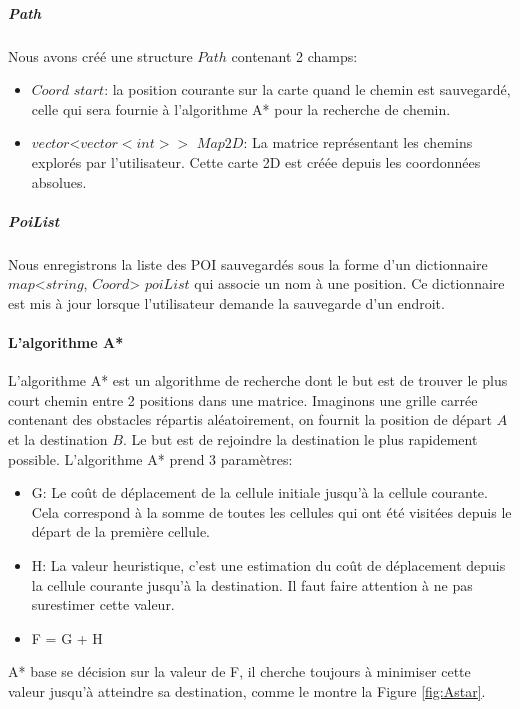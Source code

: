 \documentclass[11pt]{article}
\begin{document}
          \subparagraph{Path}        
            Nous avons créé une structure $Path$ contenant 2 champs: 
            \begin{itemize}
              \item $Coord$ $start$: la position courante sur la carte quand le chemin est sauvegardé, celle qui sera fournie à l'algorithme
              A* pour la recherche de chemin.
              \item $vector$<$vector<int>>$ $Map2D$: La matrice représentant les chemins explorés par l'utilisateur. Cette carte 2D est créée 
              depuis les coordonnées absolues.     
            \end{itemize} 

          \subparagraph{PoiList}   
            Nous enregistrons la liste des POI sauvegardés sous la forme d'un dictionnaire $map$<$string$, $Coord$> $poiList$ qui associe
            un nom à une position. Ce dictionnaire est mis à jour lorsque l'utilisateur demande la sauvegarde d'un endroit.            

        \paragraph{L'algorithme A*}
          L'algorithme A* est un algorithme de recherche dont le but est de trouver le plus court chemin entre 2 positions dans une matrice.
          Imaginons une grille carrée contenant des obstacles répartis aléatoirement, on fournit la position de départ $A$ et la destination $B$.
          Le but est de rejoindre la destination le plus rapidement possible.
          L'algorithme A* prend 3 paramètres:

          \begin{itemize}
            \item G: Le coût de déplacement de la cellule initiale jusqu'à la cellule courante. Cela correspond à la somme de toutes les 
            cellules qui ont été visitées depuis le départ de la première cellule.
            \item H: La valeur heuristique, c'est une estimation du coût de déplacement depuis la cellule courante jusqu'à la destination. 
            Il faut faire attention à ne pas surestimer cette valeur.
            \item F = G + H            
          \end{itemize} 
          A* base se décision sur la valeur de F, il cherche toujours à minimiser cette valeur jusqu'à atteindre sa destination,
          comme le montre la Figure \ref{fig:Astar}.     
          
\end{document}

